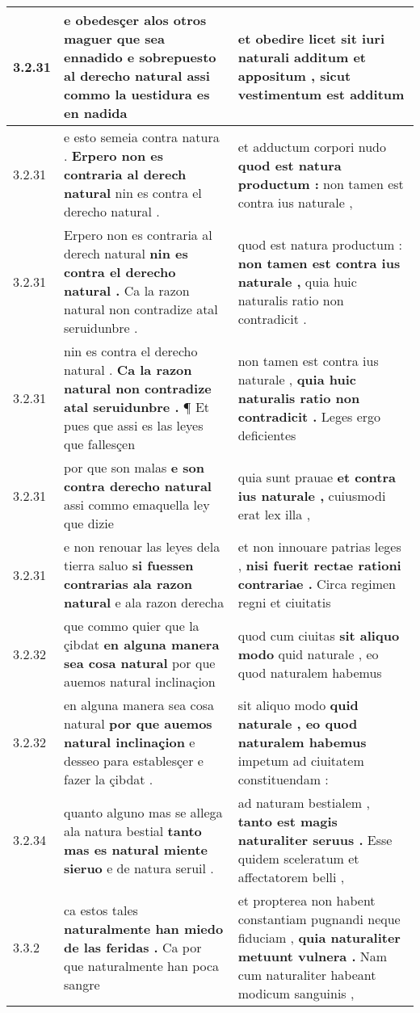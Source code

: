 \begin{tabular}{|p{1cm}|p{6.5cm}|p{6.5cm}|}
3.2.31 & e obedesçer alos otros \textbf{ maguer que sea ennadido e sobrepuesto al derecho natural } assi commo la uestidura es en nadida & et obedire licet \textbf{ sit iuri naturali additum et appositum , } sicut vestimentum est additum \\\hline
3.2.31 & e esto semeia contra natura . \textbf{ Erpero non es contraria al derech natural } nin es contra el derecho natural . & et adductum corpori nudo \textbf{ quod est natura productum : } non tamen est contra ius naturale , \\\hline
3.2.31 & Erpero non es contraria al derech natural \textbf{ nin es contra el derecho natural . } Ca la razon natural non contradize atal seruidunbre . & quod est natura productum : \textbf{ non tamen est contra ius naturale , } quia huic naturalis ratio non contradicit . \\\hline
3.2.31 & nin es contra el derecho natural . \textbf{ Ca la razon natural non contradize atal seruidunbre . } ¶ Et pues que assi es las leyes que fallesçen & non tamen est contra ius naturale , \textbf{ quia huic naturalis ratio non contradicit . } Leges ergo deficientes \\\hline
3.2.31 & por que son malas \textbf{ e son contra derecho natural } assi commo emaquella ley que dizie & quia sunt prauae \textbf{ et contra ius naturale , } cuiusmodi erat lex illa , \\\hline
3.2.31 & e non renouar las leyes dela tierra saluo \textbf{ si fuessen contrarias ala razon natural } e ala razon derecha & et non innouare patrias leges , \textbf{ nisi fuerit rectae rationi contrariae . } Circa regimen regni et ciuitatis \\\hline
3.2.32 & que commo quier que la çibdat \textbf{ en alguna manera sea cosa natural } por que auemos natural inclinaçion & quod cum ciuitas \textbf{ sit aliquo modo } quid naturale , eo quod naturalem habemus \\\hline
3.2.32 & en alguna manera sea cosa natural \textbf{ por que auemos natural inclinaçion } e desseo para establesçer e fazer la çibdat . & sit aliquo modo \textbf{ quid naturale , eo quod naturalem habemus } impetum ad ciuitatem constituendam : \\\hline
3.2.34 & quanto alguno mas se allega ala natura bestial \textbf{ tanto mas es natural miente sieruo } e de natura seruil . & ad naturam bestialem , \textbf{ tanto est magis naturaliter seruus . } Esse quidem sceleratum et affectatorem belli , \\\hline
3.3.2 & ca estos tales \textbf{ naturalmente han miedo de las feridas . } Ca por que naturalmente han poca sangre & et propterea non habent constantiam pugnandi neque fiduciam , \textbf{ quia naturaliter metuunt vulnera . } Nam cum naturaliter habeant modicum sanguinis , \\\hline

\end{tabular}
